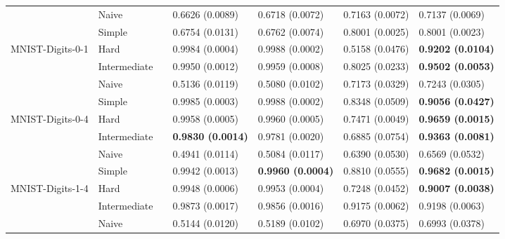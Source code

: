 \begin{tabular}{lllllll}
                 & Naive &                  &           0.6626 (0.0089) &           0.6718 (0.0072) &           0.7163 (0.0072) &           0.7137 (0.0069) \\
                 & Simple &                  &           0.6754 (0.0131) &           0.6762 (0.0074) &           0.8001 (0.0025) &           0.8001 (0.0023) \\
MNIST-Digits-0-1 & Hard &                  &           0.9984 (0.0004) &           0.9988 (0.0002) &           0.5158 (0.0476) &  \textbf{0.9202 (0.0104)} \\
                 & Intermediate &                  &           0.9950 (0.0012) &           0.9959 (0.0008) &           0.8025 (0.0233) &  \textbf{0.9502 (0.0053)} \\
                 & Naive &                  &           0.5136 (0.0119) &           0.5080 (0.0102) &           0.7173 (0.0329) &           0.7243 (0.0305) \\
                 & Simple &                  &           0.9985 (0.0003) &           0.9988 (0.0002) &           0.8348 (0.0509) &  \textbf{0.9056 (0.0427)} \\
MNIST-Digits-0-4 & Hard &                  &           0.9958 (0.0005) &           0.9960 (0.0005) &           0.7471 (0.0049) &  \textbf{0.9659 (0.0015)} \\
                 & Intermediate &                  &  \textbf{0.9830 (0.0014)} &           0.9781 (0.0020) &           0.6885 (0.0754) &  \textbf{0.9363 (0.0081)} \\
                 & Naive &                  &           0.4941 (0.0114) &           0.5084 (0.0117) &           0.6390 (0.0530) &           0.6569 (0.0532) \\
                 & Simple &                  &           0.9942 (0.0013) &  \textbf{0.9960 (0.0004)} &           0.8810 (0.0555) &  \textbf{0.9682 (0.0015)} \\
MNIST-Digits-1-4 & Hard &                  &           0.9948 (0.0006) &           0.9953 (0.0004) &           0.7248 (0.0452) &  \textbf{0.9007 (0.0038)} \\
                 & Intermediate &                  &           0.9873 (0.0017) &           0.9856 (0.0016) &           0.9175 (0.0062) &           0.9198 (0.0063) \\
                 & Naive &                  &           0.5144 (0.0120) &           0.5189 (0.0102) &           0.6970 (0.0375) &           0.6993 (0.0378) \\

\end{tabular}
